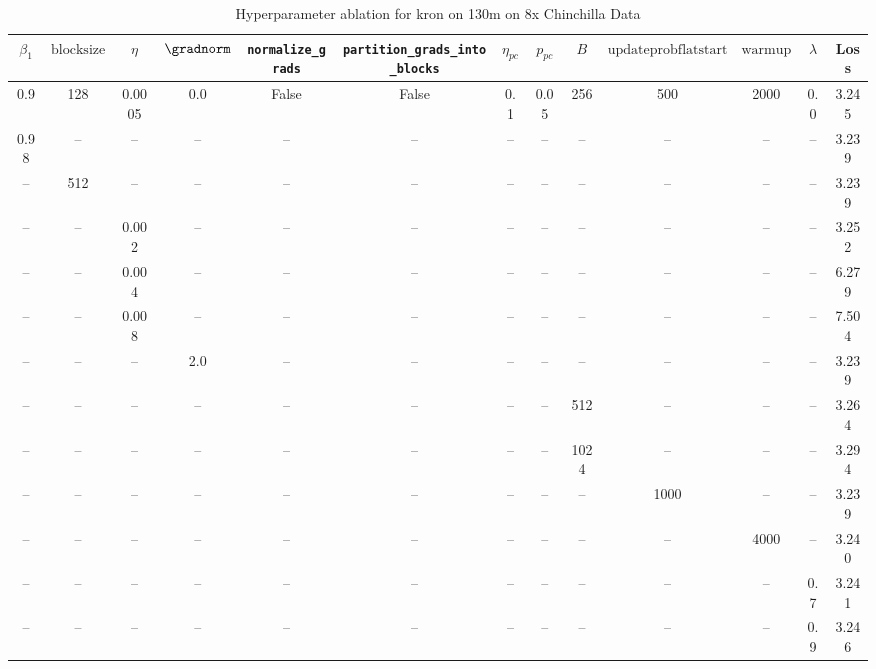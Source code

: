 \begin{table}[h!]
\centering
\caption{Hyperparameter ablation for kron on 130m on 8x Chinchilla Data}
\label{tab:ablation_kron_130m_on_8x_chinchilla_data}
\begin{tabular}{ccccccccccccc}
\toprule
$\beta_1$ & $\mathrm{block size}$ & $\eta$ & $\gradnorm$ & \texttt{normalize\_grads} & \texttt{partition\_grads\_into\_blocks} & $\eta_{pc}$ & $p_{pc}$ & $B$ & $\mathrm{update prob flat start}$ & $\mathrm{warmup}$ & $\lambda$ & Loss \\
\midrule
0.9 & 128 & 0.0005 & 0.0 & False & False & 0.1 & 0.05 & 256 & 500 & 2000 & 0.0 & 3.245 \\
\midrule
0.98 & -- & -- & -- & -- & -- & -- & -- & -- & -- & -- & -- & 3.239 \\
-- & 512 & -- & -- & -- & -- & -- & -- & -- & -- & -- & -- & 3.239 \\
-- & -- & 0.002 & -- & -- & -- & -- & -- & -- & -- & -- & -- & 3.252 \\
-- & -- & 0.004 & -- & -- & -- & -- & -- & -- & -- & -- & -- & 6.279 \\
-- & -- & 0.008 & -- & -- & -- & -- & -- & -- & -- & -- & -- & 7.504 \\
-- & -- & -- & 2.0 & -- & -- & -- & -- & -- & -- & -- & -- & 3.239 \\
-- & -- & -- & -- & -- & -- & -- & -- & 512 & -- & -- & -- & 3.264 \\
-- & -- & -- & -- & -- & -- & -- & -- & 1024 & -- & -- & -- & 3.294 \\
-- & -- & -- & -- & -- & -- & -- & -- & -- & 1000 & -- & -- & 3.239 \\
-- & -- & -- & -- & -- & -- & -- & -- & -- & -- & 4000 & -- & 3.240 \\
-- & -- & -- & -- & -- & -- & -- & -- & -- & -- & -- & 0.7 & 3.241 \\
-- & -- & -- & -- & -- & -- & -- & -- & -- & -- & -- & 0.9 & 3.246 \\
\bottomrule
\end{tabular}
\end{table}


